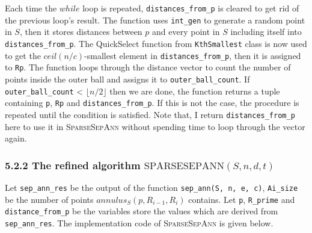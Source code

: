 \documentclass[12pt,english,]{article}
\newcommand{\code}[1]{\colorbox{light-gray}{\texttt{#1}}}
\newcommand{\pnt}[1]{{\scriptstyle#1}}
\begin{document}
Each time the \(while\) loop is repeated, \code{distances\_from\_p} is
cleared to get rid of the previous loop's result. The function uses
\code{int\_gen} to generate a random point in \(S\), then it stores
distances between \(p\) and every point in \(S\) including itself into
\code{distances\_from\_p}. The QuickSelect function from
\code{KthSmallest} class is now used to get the \(ceil(n/c)\)-smallest
element in \code{distances\_from\_p}, then it is assigned to \code{Rp}.
The function loops through the distance vector to count the number of
points inside the outer ball and assigns it to
\code{outer\_ball\_count}. If \code{outer\_ball\_count} \textless{}
\(\lfloor n/2 \rfloor\) then we are done, the function returns a tuple
containing \code{p}, \code{Rp} and \code{distances\_from\_p}. If this is
not the case, the procedure is repeated until the condition is
satisfied. Note that, I return \code{distances\_from\_p} here to use it
in \textsc{SparseSepAnn} without spending time to loop through the
vector again.

\hypertarget{section5.2.2}{%
\subsubsection{\texorpdfstring{5.2.2 The refined algorithm
\(\mathrm{S\pnt{PARSE}S\pnt{EP}A\pnt{NN}}(S,n,d,t)\)}{5.2.2 The refined algorithm \textbackslash{}mathrm\{S\textbackslash{}pnt\{PARSE\}S\textbackslash{}pnt\{EP\}A\textbackslash{}pnt\{NN\}\}(S,n,d,t)}}\label{section5.2.2}}

Let \code{sep\_ann\_res} be the output of the function
\code{sep\_ann(S, n, e, c)}, \code{Ai\_size} be the number of points
\(annulus_S(p, R_{i-1}, R_i)\) contains. Let \code{p}, \code{R\_prime}
and \code{distance\_from\_p} be the variables store the values which are
derived from \code{sep\_ann\_res}. The implementation code of
\textsc{SparseSepAnn} is given below.

~
\end{document}
